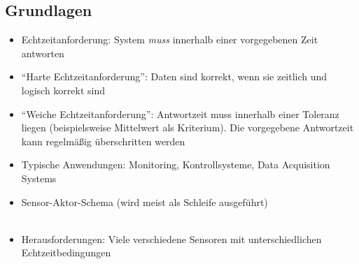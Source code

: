 \subsection{Grundlagen}
\begin{itemize}
	\item Echtzeitanforderung: System \textit{muss} innerhalb einer vorgegebenen Zeit antworten
	\item "`Harte Echtzeitanforderung"': Daten sind korrekt, wenn sie zeitlich und logisch korrekt sind
	\item "`Weiche Echtzeitanforderung"': Antwortzeit muss innerhalb einer Toleranz liegen (beispielsweise Mittelwert als Kriterium). Die vorgegebene Antwortzeit kann regelmäßig überschritten werden
	\item Typische Anwendungen: Monitoring, Kontrollsysteme, Data Acquisition Systems
	\item Sensor-Aktor-Schema (wird meist als Schleife ausgeführt)\\\\
	\item Herausforderungen: Viele verschiedene Sensoren mit unterschiedlichen Echtzeitbedingungen
\end{itemize}


